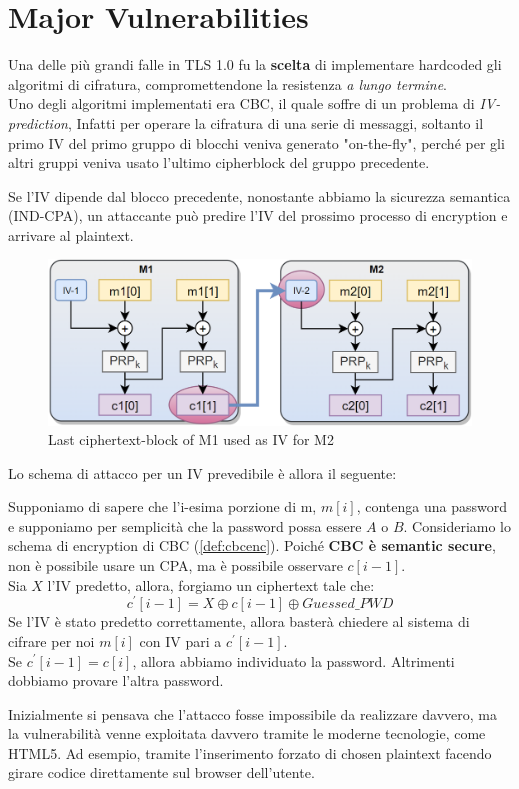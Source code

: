 \section{Major Vulnerabilities}
Una delle più grandi falle in TLS 1.0 fu la \textbf{scelta} di implementare hardcoded gli algoritmi di cifratura, compromettendone la resistenza \textit{a lungo termine}.\\
Uno degli algoritmi implementati era CBC, il quale soffre di un problema di \textit{IV-prediction}, Infatti per operare la cifratura di una serie di messaggi, soltanto il primo IV del primo gruppo di blocchi veniva generato "on-the-fly", perché per gli altri gruppi veniva usato l'ultimo cipherblock del gruppo precedente.
\begin{remark}
Se l'IV dipende dal blocco precedente, nonostante abbiamo la sicurezza semantica (IND-CPA), un attaccante può predire l'IV del prossimo processo di encryption e arrivare al plaintext.
\end{remark}
\begin{figure}[ht]
    \centering
    \includegraphics[width=\linewidth]{image/ivpred.png}
    \caption{Last ciphertext-block of M1 used as IV for M2}
    \label{fig:ivpred}
\end{figure}
Lo schema di attacco per un IV prevedibile è allora il seguente:
\begin{definition}\label{def:ivpredatk}
Supponiamo di sapere che l'i-esima porzione di m, $m[i]$, contenga una password e supponiamo per semplicità che la password possa essere $A$ o $B$. Consideriamo lo schema di encryption di CBC (\cref{def:cbcenc}). Poiché \textbf{CBC è semantic secure}, non è possibile usare un CPA, ma è possibile osservare $c[i-1]$.\\
Sia $X$ l'IV predetto, allora, forgiamo un ciphertext tale che:
\[c^{'}[i-1]=X\oplus{c[i-1]}\oplus{Guessed\_PWD}\]
Se l'IV è stato predetto correttamente, allora basterà chiedere al sistema di cifrare per noi $m[i]$ con IV pari a  $c^{'}[i-1]$. \\
Se $c^{'}[i-1]=c[i]$, allora abbiamo individuato la password. Altrimenti dobbiamo provare l'altra password.
\end{definition}
\begin{remark}
Inizialmente si pensava che l'attacco fosse impossibile da realizzare davvero, ma la vulnerabilità venne exploitata davvero tramite le moderne tecnologie, come HTML5. Ad esempio, tramite l'inserimento forzato di chosen plaintext facendo girare codice direttamente sul browser dell'utente.
\end{remark}
